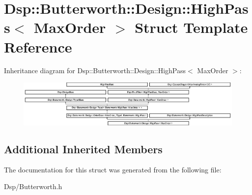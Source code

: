 \hypertarget{structDsp_1_1Butterworth_1_1Design_1_1HighPass}{\section{Dsp\-:\-:Butterworth\-:\-:Design\-:\-:High\-Pass$<$ Max\-Order $>$ Struct Template Reference}
\label{structDsp_1_1Butterworth_1_1Design_1_1HighPass}
}
Inheritance diagram for Dsp\-:\-:Butterworth\-:\-:Design\-:\-:High\-Pass$<$ Max\-Order $>$\-:\begin{figure}[H]
\begin{center}
\leavevmode
\includegraphics[height=2.338205cm]{structDsp_1_1Butterworth_1_1Design_1_1HighPass}
\end{center}
\end{figure}
\subsection*{Additional Inherited Members}


The documentation for this struct was generated from the following file\-:\begin{DoxyCompactItemize}
\item 
Dsp/Butterworth.\-h\end{DoxyCompactItemize}
